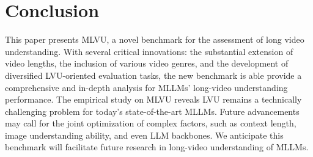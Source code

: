 \section{Conclusion}
\vspace{-0.2cm}
\label{conclusion}
This paper presents MLVU, a novel benchmark for the assessment of long video understanding. With several critical innovations: the substantial extension of video lengths, the inclusion of various video genres, and the development of diversified LVU-oriented evaluation tasks, the new benchmark is able provide a comprehensive and in-depth analysis for MLLMs' long-video understanding performance. The empirical study on MLVU reveals LVU remains a technically challenging problem for today's state-of-the-art MLLMs. Future advancements may call for the joint optimization of complex factors, such as context length, image understanding ability, and even LLM backbones. We anticipate this benchmark will facilitate future research in long-video understanding of MLLMs. 
{
    \small
        }

\clearpage
\setcounter{page}{1}
\maketitlesupplementary

